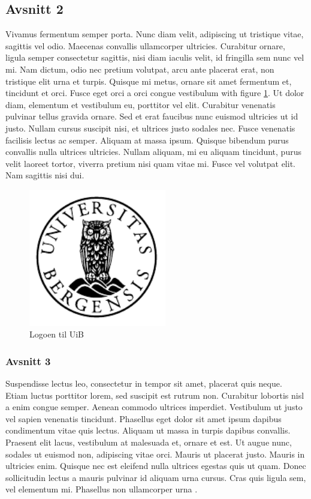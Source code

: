 \documentclass[12pt]{article}
\begin{document}
\subsection{Avsnitt 2}
\label{sec-1-1}
Vivamus fermentum semper porta. Nunc diam velit, adipiscing ut tristique vitae, sagittis vel odio. Maecenas convallis ullamcorper ultricies. Curabitur ornare, ligula semper consectetur sagittis, nisi diam iaculis velit, id fringilla sem nunc vel mi. Nam dictum, odio nec pretium volutpat, arcu ante placerat erat, non tristique elit urna et turpis. Quisque mi metus, ornare sit amet fermentum et, tincidunt et orci. Fusce eget orci a orci congue vestibulum with figure \ref{fig:logo}. Ut dolor diam, elementum et vestibulum eu, porttitor vel elit. Curabitur venenatis pulvinar tellus gravida ornare. Sed et erat faucibus nunc euismod ultricies ut id justo. Nullam cursus suscipit nisi, et ultrices justo sodales nec. Fusce venenatis facilisis lectus ac semper. Aliquam at massa ipsum. Quisque bibendum purus convallis nulla ultrices ultricies. Nullam aliquam, mi eu aliquam tincidunt, purus velit laoreet tortor, viverra pretium nisi quam vitae mi. Fusce vel volutpat elit. Nam sagittis nisi dui.


\begin{figure}[htbp]
\centering
\includegraphics[height=6cm]{img/uib-emblem-svart}
\caption{Logoen til UiB}
\label{fig:logo}
\end{figure}


\subsubsection{Avsnitt 3}
\label{sec-1-1-1}
Suspendisse lectus leo, consectetur in tempor sit amet, placerat quis neque. Etiam luctus porttitor lorem, sed suscipit est rutrum non. Curabitur lobortis nisl a enim congue semper. Aenean commodo ultrices imperdiet. Vestibulum ut justo vel sapien venenatis tincidunt. Phasellus eget dolor sit amet ipsum dapibus condimentum vitae quis lectus. Aliquam ut massa in turpis dapibus convallis. Praesent elit lacus, vestibulum at malesuada et, ornare et est. Ut augue nunc, sodales ut euismod non, adipiscing vitae orci. Mauris ut placerat justo. Mauris in ultricies enim. Quisque nec est eleifend nulla ultrices egestas quis ut quam. Donec sollicitudin lectus a mauris pulvinar id aliquam urna cursus. Cras quis ligula sem, vel elementum mi. Phasellus non ullamcorper urna \citep{wirth1976algorithms}.
\end{document}
